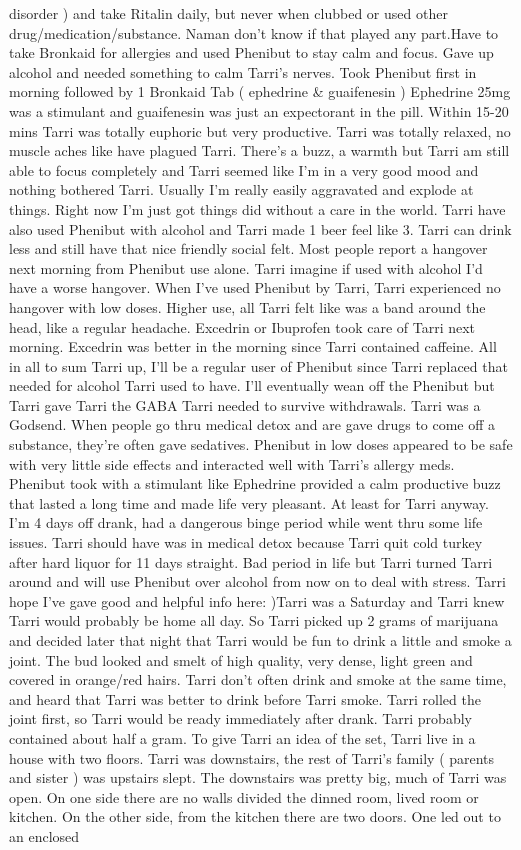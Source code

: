 \documentclass[12pt]{book}
\begin{document}
disorder ) and take Ritalin daily, but never when clubbed or used other drug/medication/substance. Naman don't know if that played any part.Have to take Bronkaid for allergies and used Phenibut to stay calm and focus. Gave up alcohol and needed something to calm Tarri's nerves. Took Phenibut first in morning followed by 1 Bronkaid Tab ( ephedrine \& guaifenesin ) Ephedrine 25mg was a stimulant and guaifenesin was just an expectorant in the pill. Within 15-20 mins Tarri was totally euphoric but very productive. Tarri was totally relaxed, no muscle aches like have plagued Tarri. There's a buzz, a warmth but Tarri am still able to focus completely and Tarri seemed like I'm in a very good mood and nothing bothered Tarri. Usually I'm really easily aggravated and explode at things. Right now I'm just got things did without a care in the world. Tarri have also used Phenibut with alcohol and Tarri made 1 beer feel like 3. Tarri can drink less and still have that nice friendly social felt. Most people report a hangover next morning from Phenibut use alone. Tarri imagine if used with alcohol I'd have a worse hangover. When I've used Phenibut by Tarri, Tarri experienced no hangover with low doses. Higher use, all Tarri felt like was a band around the head, like a regular headache. Excedrin or Ibuprofen took care of Tarri next morning. Excedrin was better in the morning since Tarri contained caffeine. All in all to sum Tarri up, I'll be a regular user of Phenibut since Tarri replaced that needed for alcohol Tarri used to have. I'll eventually wean off the Phenibut but Tarri gave Tarri the GABA Tarri needed to survive withdrawals. Tarri was a Godsend. When people go thru medical detox and are gave drugs to come off a substance, they're often gave sedatives. Phenibut in low doses appeared to be safe with very little side effects and interacted well with Tarri's allergy meds. Phenibut took with a stimulant like Ephedrine provided a calm productive buzz that lasted a long time and made life very pleasant. At least for Tarri anyway. I'm 4 days off drank, had a dangerous binge period while went thru some life issues. Tarri should have was in medical detox because Tarri quit cold turkey after hard liquor for 11 days straight. Bad period in life but Tarri turned Tarri around and will use Phenibut over alcohol from now on to deal with stress. Tarri hope I've gave good and helpful info here: )Tarri was a Saturday and Tarri knew Tarri would probably be home all day. So Tarri picked up 2 grams of marijuana and decided later that night that Tarri would be fun to drink a little and smoke a joint. The bud looked and smelt of high quality, very dense, light green and covered in orange/red hairs. Tarri don't often drink and smoke at the same time, and heard that Tarri was better to drink before Tarri smoke. Tarri rolled the joint first, so Tarri would be ready immediately after drank. Tarri probably contained about half a gram. To give Tarri an idea of the set, Tarri live in a house with two floors. Tarri was downstairs, the rest of Tarri's family ( parents and sister ) was upstairs slept. The downstairs was pretty big, much of Tarri was open. On one side there are no walls divided the dinned room, lived room or kitchen. On the other side, from the kitchen there are two doors. One led out to an enclosed 
\end{document}
